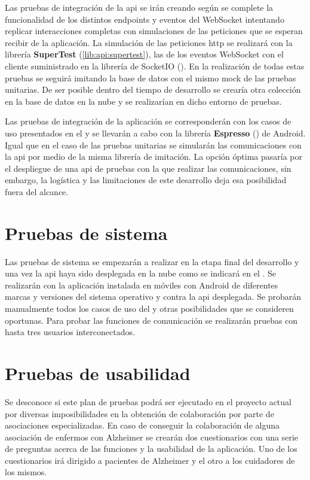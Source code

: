 Las pruebas de integración de la \acrshort{api} se irán creando según se complete la funcionalidad de los distintos \glspl{endpoint} y eventos del WebSocket intentando replicar interacciones completas con simulaciones de las peticiones que se esperan recibir de la aplicación. La simulación de las peticiones \acrshort{http} se realizará con la librería \textbf{SuperTest} (\ref{lib:api:supertest}), las de los eventos WebSocket con el cliente suministrado en la librería de SocketIO (). En la realización de todas estas pruebas se seguirá imitando la base de datos con el mismo \gls{mock} de las pruebas unitarias. De ser posible dentro del tiempo de desarrollo se crearía otra colección en la base de datos en la nube y se realizarían en dicho entorno de pruebas.

Las pruebas de integración de la aplicación se corresponderán con los casos de uso presentados en el  y se llevarán a cabo con la librería \textbf{Espresso} () de Android. Igual que en el caso de las pruebas unitarias se simularán las comunicaciones con la \acrshort{api} por medio de la misma librería de imitación. La opción óptima pasaría por el despliegue de una \acrshort{api} de pruebas con la que realizar las comunicaciones, sin embargo, la logística y las limitaciones de este desarrollo deja esa posibilidad fuera del alcance.

\section{Pruebas de sistema}
Las pruebas de sistema se empezarán a realizar en la etapa final del desarrollo y una vez la \acrshort{api} haya sido desplegada en la nube como se indicará en el . Se realizarán con la aplicación instalada en móviles con Android de diferentes marcas y versiones del sistema operativo y contra la \acrshort{api} desplegada. Se probarán manualmente todos los casos de uso del  y otras posibilidades que se consideren oportunas. Para probar las funciones de comunicación se realizarán pruebas con hasta tres usuarios interconectados.

\section{Pruebas de usabilidad}

Se desconoce si este plan de pruebas podrá ser ejecutado en el proyecto actual por diversas imposibilidades en la obtención de colaboración por parte de asociaciones especializadas. En caso de conseguir la colaboración de alguna asociación de enfermos con Alzheimer se crearán dos cuestionarios con una serie de preguntas acerca de las funciones y la usabilidad de la aplicación. Uno de los cuestionarios irá dirigido a pacientes de Alzheimer y el otro a los cuidadores de los mismos.